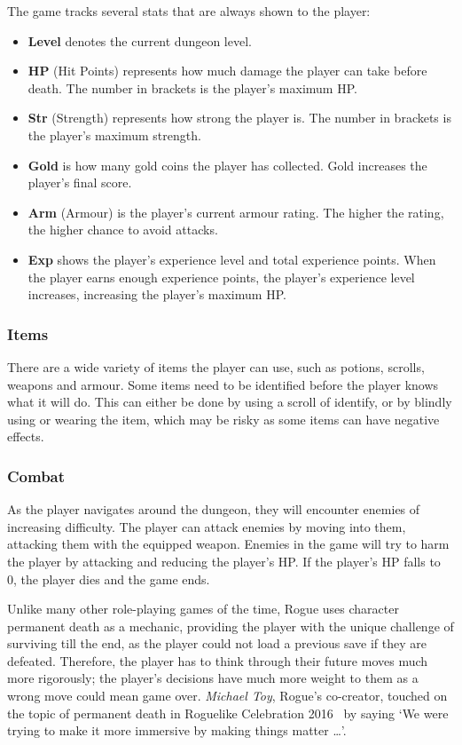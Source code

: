 \documentclass[12pt,a4paper]{article}
\begin{document}
    The game tracks several stats that are always shown to the player:
    \begin{itemize}
        \item \textbf{Level} denotes the current dungeon level.
        \item \textbf{HP} (Hit Points) represents how much damage the player can take before death.
        The number in brackets is the player's maximum HP.
        \item \textbf{Str} (Strength) represents how strong the player is.
        The number in brackets is the player's maximum strength.
        \item \textbf{Gold} is how many gold coins the player has collected.
        Gold increases the player's final score.
        \item \textbf{Arm} (Armour) is the player's current armour rating.
        The higher the rating, the higher chance to avoid attacks.
        \item \textbf{Exp} shows the player's experience level and total experience points.
        When the player earns enough experience points, the player's experience level increases, increasing the player's maximum HP.
    \end{itemize}

    \subsubsection{Items}\label{subsubsec:items}
    There are a wide variety of items the player can use, such as potions, scrolls, weapons and armour.
    Some items need to be identified before the player knows what it will do.
    This can either be done by using a scroll of identify, or by blindly using or wearing the item, which may be risky as some items can have negative effects.

    \subsubsection{Combat}\label{subsubsec:combat}
    As the player navigates around the dungeon, they will encounter enemies of increasing difficulty.
    The player can attack enemies by moving into them, attacking them with the equipped weapon.
    Enemies in the game will try to harm the player by attacking and reducing the player's HP\@.
    If the player's HP falls to 0, the player dies and the game ends.

    Unlike many other role-playing games of the time, Rogue uses character permanent death as a mechanic, providing the player with
    the unique challenge of surviving till the end, as the player could not load a previous save if they are defeated.
    Therefore, the player has to think through their future moves much more rigorously;
    the player's decisions have much more weight to them as a wrong move could mean game over.
    \emph{Michael Toy}, Rogue's co-creator, touched on the topic of permanent death in Roguelike Celebration 2016~\citep{gamasutra16} by saying `We were trying to make it more immersive by making things matter \ldots'.
\end{document}

